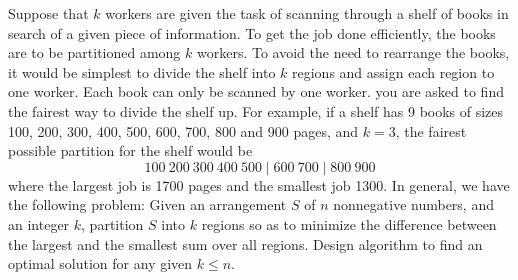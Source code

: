 \begin{Exercise}[origin={NCU CSIE 96}]
Suppose that $k$ workers are given the task of scanning through a shelf of books in search of a given piece of information. To get the job done efficiently, the books are to be partitioned among $k$ workers. To avoid the need to rearrange the books, it would be simplest to divide the shelf into $k$ regions and assign each region to one worker. Each book can only be scanned by one worker. you are asked to find the fairest way to divide the shelf up. For example, if a shelf has 9 books of sizes 100, 200, 300, 400, 500, 600, 700, 800 and 900 pages, and $k = 3$, the fairest possible partition for the shelf would be
\[ 100~200~300~400~500 \mid 600~700 \mid 800~900 \]
where the largest job is 1700 pages and the smallest job 1300. In general, we have the following problem: Given an arrangement $S$ of $n$ nonnegative numbers, and an integer $k$, partition $S$ into $k$ regions so as to minimize the difference between the largest and the smallest sum over all regions.
Design algorithm to find an optimal solution for any given $k \leq n$.
\end{Exercise}
